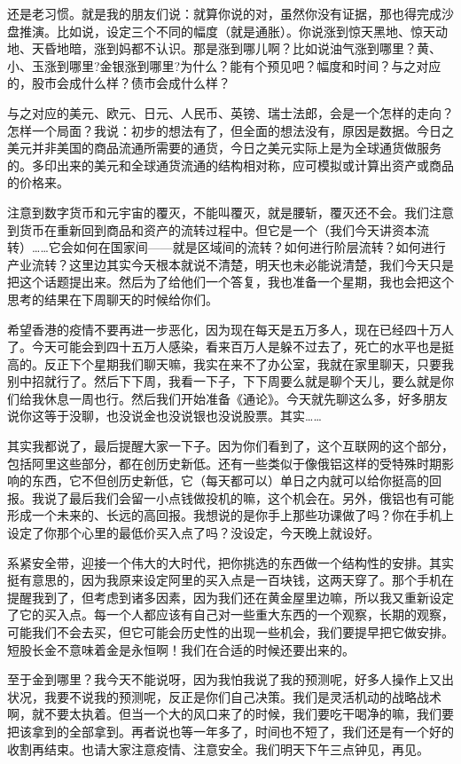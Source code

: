 \documentclass[UTF8, 12pt, a4paper]{ctexrep}
\begin{document}
还是老习惯。就是我的朋友们说：就算你说的对，虽然你没有证据，那也得完成沙盘推演。比如说，设定三个不同的幅度（就是通胀）。你说涨到惊天黑地、惊天动地、天昏地暗，涨到妈都不认识。那是涨到哪儿啊？比如说油气涨到哪里？黄、小、玉涨到哪里?金银涨到哪里?为什么？能有个预见吧？幅度和时间？与之对应的，股市会成什么样？债市会成什么样？

与之对应的美元、欧元、日元、人民币、英镑、瑞士法郎，会是一个怎样的走向？怎样一个局面？我说：初步的想法有了，但全面的想法没有，原因是数据。今日之美元并非美国的商品流通所需要的通货，今日之美元实际上是为全球通货做服务的。多印出来的美元和全球通货流通的结构相对称，应可模拟或计算出资产或商品的价格来。

注意到数字货币和元宇宙的覆灭，不能叫覆灭，就是腰斩，覆灭还不会。我们注意到货币在重新回到商品和资产的流转过程中。但它是一个（我们今天讲资本流转）……它会如何在国家间——就是区域间的流转？如何进行阶层流转？如何进行产业流转？这里边其实今天根本就说不清楚，明天也未必能说清楚，我们今天只是把这个话题提出来。然后为了给他们一个答复，我也准备一个星期，我也会把这个思考的结果在下周聊天的时候给你们。

希望香港的疫情不要再进一步恶化，因为现在每天是五万多人，现在已经四十万人了。今天可能会到四十五万人感染，看来百万人是躲不过去了，死亡的水平也是挺高的。反正下个星期我们聊天嘛，我实在来不了办公室，我就在家里聊天，只要我别中招就行了。然后下下周，我看一下子，下下周要么就是聊个天儿，要么就是你们给我休息一周也行。然后我们开始准备《通论》。今天就先聊这么多，好多朋友说你这等于没聊，也没说金也没说银也没说股票。其实……

其实我都说了，最后提醒大家一下子。因为你们看到了，这个互联网的这个部分，包括阿里这些部分，都在创历史新低。还有一些类似于像俄铝这样的受特殊时期影响的东西，它不但创历史新低，它（每天都可以）单日之内就可以给你挺高的回报。我说了最后我们会留一小点钱做投机的嘛，这个机会在。另外，俄铝也有可能形成一个未来的、长远的高回报。我想说的是你手上那些功课做了吗？你在手机上设定了你那个心里的最低价买入点了吗？没设定，今天晚上就设好。

系紧安全带，迎接一个伟大的大时代，把你挑选的东西做一个结构性的安排。其实挺有意思的，因为我原来设定阿里的买入点是一百块钱，这两天穿了。那个手机在提醒我到了，但考虑到诸多因素，因为我们还在黄金屋里边嘛，所以我又重新设定了它的买入点。每一个人都应该有自己对一些重大东西的一个观察，长期的观察，可能我们不会去买，但它可能会历史性的出现一些机会，我们要提早把它做安排。短股长金不意味着金是永恒啊！我们在合适的时候还要出来的。

至于金到哪里？我今天不能说呀，因为我怕我说了我的预测呢，好多人操作上又出状况，我要不说我的预测呢，反正是你们自己决策。我们是灵活机动的战略战术啊，就不要太执着。但当一个大的风口来了的时候，我们要吃干喝净的嘛，我们要把该拿到的全部拿到。再者说也等一年多了，时间也不短了，我们还是有一个好的收割再结束。也请大家注意疫情、注意安全。我们明天下午三点钟见，再见。
\end{document}
